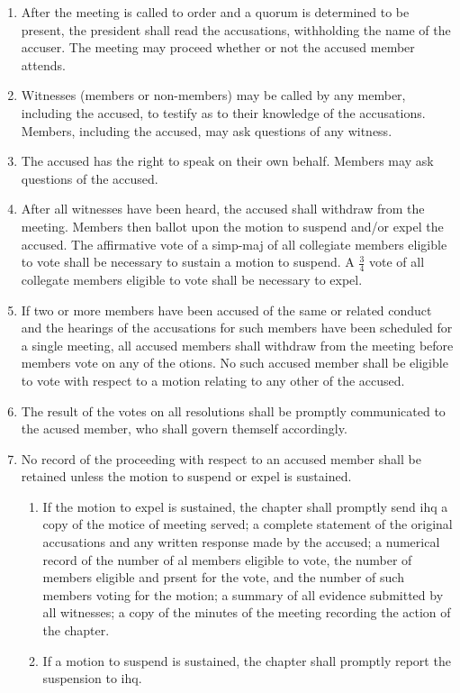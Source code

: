 	\begin{enumerate}
		\item After the meeting is called to order and a quorum is determined to be present, the president shall read the accusations, withholding the name of the accuser. The meeting may proceed whether or not the accused member attends.
		\item Witnesses (members or non-members) may be called by any member, including the accused, to testify as to their knowledge of the accusations. Members, including the accused, may ask questions of any witness.
		\item The accused has the right to speak on their own behalf. Members may ask questions of the accused.
		\item After all witnesses have been heard, the accused shall withdraw from the meeting. Members then ballot upon the motion to suspend and/or expel the accused. The affirmative vote of a \gls{simp-maj} of all collegiate members eligible to vote shall be necessary to sustain a motion to suspend. A $\frac{3}{4}$ vote of all collegate members eligible to vote shall be necessary to expel.
		\item If two or more members have been accused of the same or related conduct and the hearings of the accusations for such members have been scheduled for a single meeting, all accused members shall withdraw from the meeting before members vote on any of the otions. No such accused member shall be eligible to vote with respect to a motion relating to any other of the accused.
		\item The result of the votes on all resolutions shall be promptly communicated to the acused member, who shall govern themself accordingly.
		\item No record of the proceeding with respect to an accused member shall be retained unless the motion to suspend or expel is sustained.
			\begin{enumerate}
				\item If the motion to expel is sustained, the chapter shall promptly send \gls{ihq} a copy of the motice of meeting served; a complete statement of the original accusations and any written response made by the accused; a numerical record of the number of al members eligible to vote, the number of members eligible and prsent for the vote, and the number of such members voting for the motion; a summary of all evidence submitted by all witnesses; a copy of the minutes of the meeting recording the action of the chapter.
				\item If a motion to suspend is sustained, the chapter shall promptly report the suspension to \gls{ihq}.
			\end{enumerate}

	\end{enumerate}

